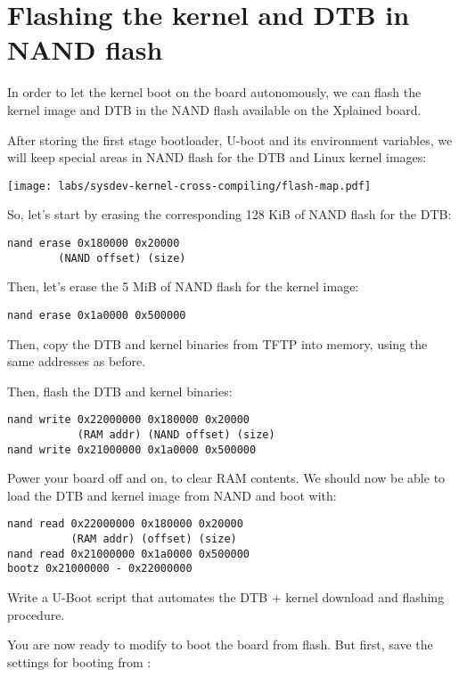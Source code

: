 {
\section{Flashing the kernel and DTB in NAND flash}

In order to let the kernel boot on the board autonomously, we can
flash the kernel image and DTB in the NAND flash available on the
Xplained board.

After storing the first stage bootloader, U-boot and its environment
variables, we will keep special areas in NAND flash for the DTB
and Linux kernel images:

\begin{center}
  \texttt{[image: labs/sysdev-kernel-cross-compiling/flash-map.pdf]}
\end{center}

So, let's start by erasing the corresponding 128 KiB of NAND flash
for the DTB:
\begin{verbatim}
nand erase 0x180000 0x20000
        (NAND offset) (size)
\end{verbatim}

Then, let's erase the 5 MiB of NAND flash for the kernel image:
\begin{verbatim}
nand erase 0x1a0000 0x500000
\end{verbatim}

Then, copy the DTB and kernel binaries from TFTP into memory, using the
same addresses as before.

Then, flash the DTB and kernel binaries:
\begin{verbatim}
nand write 0x22000000 0x180000 0x20000
           (RAM addr) (NAND offset) (size)
nand write 0x21000000 0x1a0000 0x500000
\end{verbatim}

Power your board off and on, to clear RAM contents. We should now be
able to load the DTB and kernel image from NAND and boot with:

\begin{verbatim}
nand read 0x22000000 0x180000 0x20000
          (RAM addr) (offset) (size)
nand read 0x21000000 0x1a0000 0x500000
bootz 0x21000000 - 0x22000000
\end{verbatim}

Write a U-Boot script that automates the DTB + kernel download
and flashing procedure.

You are now ready to modify  to boot the board
from flash. But first, save the settings for booting from :

}
